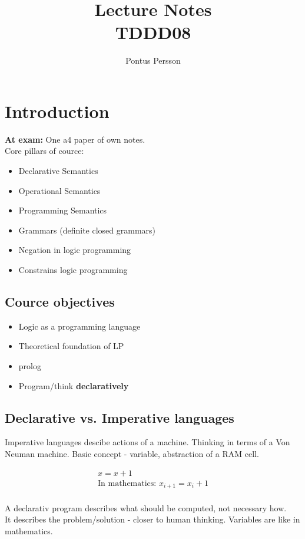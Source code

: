 \documentclass[a4paper]{article}
\author{Pontus Persson}
\title{Lecture Notes\\TDDD08}
\begin{document}
\maketitle
\tableofcontents

\section{Introduction}
\label{sec:introduction}
\textbf{At exam:} One a4 paper of own notes.\\
Core pillars of cource:
\begin{itemize}
\item Declarative Semantics
\item Operational Semantics
\item Programming Semantics
\item Grammars (definite closed grammars)
\item Negation in logic programming
\item Constrains logic programming
\end{itemize}

\subsection{Cource objectives}
\begin{itemize}
\item Logic as a programming language
\item Theoretical foundation of LP
\item prolog
\item Program/think \textbf{declaratively}
\end{itemize}

\subsection{Declarative vs. Imperative languages}
Imperative languages descibe actions of a machine. Thinking in terms of a Von
Neuman machine. Basic concept - variable, abstraction of a RAM cell.

\begin{align}
 x=x+1\\
\mbox{In mathematics: }x_{i+1} = x_i+1
\end{align}
\\
A declarativ program describes what should be computed, not necessary how.
\\It describes the problem/solution - closer to human thinking. Variables are
like in mathematics.
\end{document}
